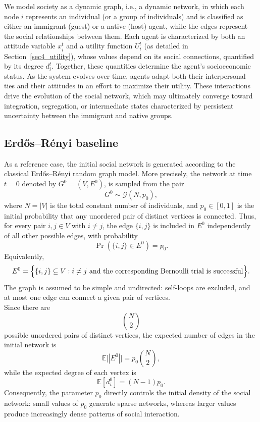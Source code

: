 \documentclass[11pt,a4paper]{article}
\begin{document}
	We model society as a dynamic graph, i.e., a dynamic network, in which each node $i$ represents an individual (or a group of individuals) and is classified as  either an immigrant (guest) or a native (host) agent, while the edges represent the social relationships between them. Each agent is characterized by both an attitude variable $x_i^t$ and a utility function $U_i^t$ (as detailed in Section~\ref{sec4_utility}), whose values depend on its social connections, quantified by its degree $d_i^t$. Together, these quantities determine the agent's socioeconomic status. As the system evolves over time, agents adapt both their interpersonal ties and their attitudes in an effort to maximize their utility. These interactions drive the evolution of the social network, which may ultimately converge toward integration, segregation, or intermediate states characterized by persistent uncertainty between the immigrant and native groups.

	\subsection{Erd\H{o}s--R\'enyi baseline}
	As a reference case, the initial social network is generated according to the classical Erd\H{o}s--R\'enyi random graph model. More precisely, the network at time $t=0$ denoted by
	$G^0 = (V,E^0)$, is sampled from the pair
	$$
	G^0 \sim \mathcal{G}(N,p_0),
	$$
	where $N=|V|$ is the total constant number of individuals, and $p_0 \in [0,1]$ is the initial probability that any unordered pair of distinct vertices is connected. Thus, for every pair $i,j\in V$ with $i\neq j$, the edge $\{i,j\}$ is included in $E^0$ independently of all other possible edges, with probability
	$$
	\Pr\left( \{i,j\} \in E^0 \right) = p_0.
	$$
	Equivalently,
	$$
	E^0 = \Bigl\{ \{i,j\}\subseteq V: i\neq j \text{ and the corresponding Bernoulli trial is successful} \Bigr\}.
	$$
	The graph is assumed to be simple and undirected: self-loops are
	excluded, and at most one edge can connect a given pair of vertices.
	\\
	Since there are
	$$
	\binom{N}{2}
	$$
	possible unordered pairs of distinct vertices, the expected number of edges in the initial network is
	$$
	\mathbb{E}\bigl[|E^0|\bigr] = p_0\binom{N}{2},
	$$
	while the expected degree of each vertex is
	$$
	\mathbb{E}[d_i^0] = (N-1)p_0.
	$$
	Consequently, the parameter $p_0$ directly controls the initial density of the social network: small values of $p_0$ generate sparse networks, whereas larger values produce increasingly dense patterns of social interaction.
	
\end{document}
